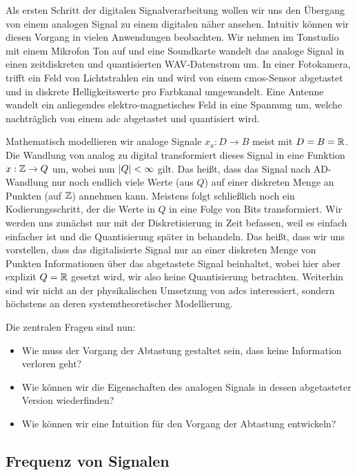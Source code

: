 %
Als ersten Schritt der digitalen Signalverarbeitung wollen wir uns den Übergang von einem analogen Signal zu einem digitalen näher ansehen.
Intuitiv können wir diesen Vorgang in vielen Anwendungen beobachten.
Wir nehmen im Tonstudio mit einem Mikrofon Ton auf und eine Soundkarte wandelt das analoge Signal in einen zeitdiskreten und quantisierten WAV-Datenstrom um.
In einer Fotokamera, trifft ein Feld von Lichtstrahlen ein und wird von einem \gls{cmos}-Sensor  abgetastet und in diskrete Helligkeitswerte pro Farbkanal umgewandelt.
Eine Antenne wandelt ein anliegendes elektro-magnetisches Feld in eine Spannung um, welche nachträglich von einem \gls{adc} abgetastet und quantisiert wird.

Mathematisch modellieren wir analoge Signale $x_a : D \rightarrow B$ meist mit $D = B = \mathbb{R}$.
Die Wandlung von analog zu digital transformiert dieses Signal in eine Funktion $x: \mathbb{Z} \rightarrow Q$ um, wobei nun ${\left| Q \right|} < \infty$ gilt.
Das heißt, dass das Signal nach AD-Wandlung nur noch endlich viele Werte (aus $Q$) auf einer diskreten Menge an Punkten (auf $\mathbb{Z}$) annehmen kann.
Meistens folgt schließlich noch ein Kodierungsschritt, der die Werte in $Q$ in eine Folge von Bits transformiert.
Wir werden uns zunächst nur mit der Diskretisierung in Zeit befassen, weil es einfach einfacher ist und die Quantisierung später in  behandeln.
Das heißt, dass wir uns vorstellen, dass das digitalisierte Signal nur an einer diskreten Menge von Punkten Informationen über das abgetastete Signal beinhaltet, wobei hier aber explizit $Q = \mathbb{R}$ gesetzt wird, wir also keine Quantisierung betrachten.
Weiterhin sind wir nicht an der physikalischen Umsetzung von \glspl{adc} interessiert, sondern höchstens an deren systemtheoretischer Modellierung.

Die zentralen Fragen sind nun:
\begin{itemize}
    \item Wie muss der Vorgang der Abtastung gestaltet sein, dass keine Information verloren geht?
    \item Wie können wir die Eigenschaften des analogen Signals in dessen abgetasteter Version wiederfinden?
    \item Wie können wir eine Intuition für den Vorgang der Abtastung entwickeln?
\end{itemize}
%
\subsection{Frequenz von Signalen}
%
